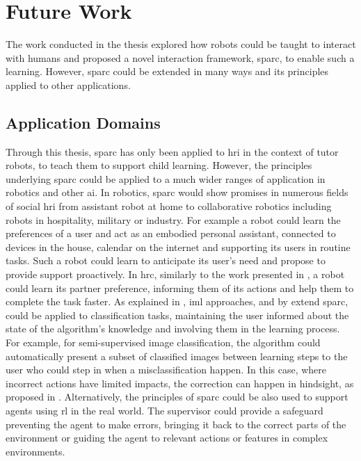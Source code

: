 \section{Future Work}
The work conducted in the thesis explored how robots could be taught to interact with humans and proposed a novel interaction framework, \gls{sparc}, to enable such a learning. However, \gls{sparc} could be extended in many ways and its principles applied to other applications.

\subsection{Application Domains}

Through this thesis, \gls{sparc} has only been applied to \gls{hri} in the context of tutor robots, to teach them to support child learning. However, the principles underlying \gls{sparc} could be applied to a much wider ranges of application in robotics and other \gls{ai}. In robotics, \gls{sparc} would show promises in numerous fields of social \gls{hri} from assistant robot at home to collaborative robotics including robots in hospitality, military or industry. For example a robot could learn the preferences of a user and act as an embodied personal assistant, connected to devices in the house, calendar on the internet and supporting its users in routine tasks. Such a robot could learn to anticipate its user's need and propose to provide support proactively. In \gls{hrc}, similarly to the work presented in \cite{munzer2017efficient}, a robot could learn its partner preference, informing them of its actions and help them to complete the task faster. As explained in \cite{feil2005defining}, \gls{iml} approaches, and by extend \gls{sparc}, could be applied to classification tasks, maintaining the user informed about the state of the algorithm's knowledge and involving them in the learning process. For example, for semi-supervised image classification, the algorithm could automatically present a subset of classified images between learning steps to the user who could step in when a misclassification happen. In this case, where incorrect actions have limited impacts, the correction can happen in hindsight, as proposed in \cite{chernova2009interactive}. Alternatively, the principles of \gls{sparc} could be also used to support agents using \gls{rl} in the real world. The supervisor could provide a safeguard preventing the agent to make errors, bringing it back to the correct parts of the environment or guiding the agent to relevant actions or features in complex environments.

